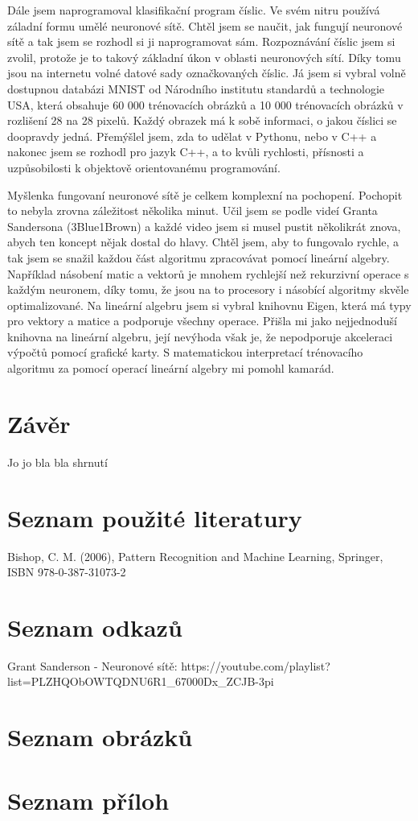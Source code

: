 \documentclass[a4paper,12pt, oneside]{book}
\begin{document}
Dále jsem naprogramoval klasifikační program číslic. Ve svém nitru používá
záladní formu umělé neuronové sítě.
Chtěl jsem se naučit, jak fungují neuronové sítě a tak jsem se rozhodl si
ji naprogramovat sám. Rozpoznávání číslic jsem si zvolil, protože je
to takový základní úkon v oblasti neuronových sítí. Díky tomu jsou
na internetu volné datové sady označkovaných číslic. Já jsem si vybral
volně dostupnou databázi MNIST od Národního institutu standardů a technologie USA,
která obsahuje 60 000 trénovacích obrázků a 10 000 trénovacích obrázků v rozlišení
28 na 28 pixelů. Každý obrazek má k sobě informaci, o jakou číslici se doopravdy jedná.
Přemýšlel jsem, zda to udělat v Pythonu, nebo v C++ a nakonec jsem se
rozhodl pro jazyk C++, a to kvůli rychlosti, přísnosti a uzpůsobilosti k objektově
orientovanému programování.

Myšlenka fungovaní neuronové sítě je celkem komplexní na pochopení. Pochopit to nebyla
zrovna záležitost několika minut. Učil jsem se podle videí Granta Sandersona (3Blue1Brown)
a každé video jsem si musel pustit několikrát znova, abych ten koncept nějak dostal do hlavy.
Chtěl jsem, aby to fungovalo rychle, a tak jsem se snažil každou část algoritmu zpracovávat
pomocí lineární algebry. Například násobení matic a vektorů je mnohem rychlejší než rekurzivní
operace s každým neuronem, díky tomu, že jsou na to procesory i násobící algoritmy skvěle
optimalizované. Na lineární algebru jsem si vybral knihovnu Eigen, která má typy pro
vektory a matice a podporuje všechny operace. Přišla mi jako nejjednoduší knihovna na
lineární algebru, její nevýhoda však je, že nepodporuje akceleraci výpočtů pomocí grafické
karty. S matematickou interpretací trénovacího algoritmu za pomocí operací
lineární algebry mi pomohl kamarád.








\chapter{Závěr}

Jo jo bla bla shrnutí

\chapter{Seznam použité literatury}
Bishop, C. M. (2006), Pattern Recognition and Machine Learning, Springer, ISBN 978-0-387-31073-2

\chapter{Seznam odkazů}

Grant Sanderson - Neuronové sítě:
https://youtube.com/playlist?list=PLZHQObOWTQDNU6R1_67000Dx_ZCJB-3pi



\chapter{Seznam obrázků}


\chapter{Seznam příloh}
\end{document}
